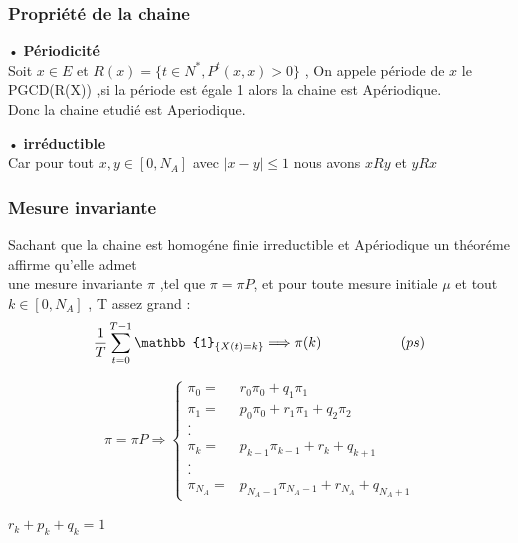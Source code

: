 \documentclass[11pt,]{article}
\begin{document}
\subsubsection{Propriété de la chaine}\label{propriete-de-la-chaine}

• \textbf{Périodicité}\\
Soit \(x \in E\) et \(R(x)=\{t \in N^*, P^t(x,x)>0 \}\) , On appele
période de \(x\) le PGCD(R(X)) ,si la période est égale 1 alors la
chaine est Apériodique.\\
Donc la chaine etudié est Aperiodique.

• \textbf{irréductible}\\
Car pour tout \(x, y\in[0,N_A]\) avec \(|x-y|\leq 1\) nous avons
\(x R y\) et \(yRx\)

\subsubsection{Mesure invariante}\label{mesure-invariante}

Sachant que la chaine est homogéne finie irreductible et Apériodique un
théoréme affirme qu'elle admet\\
une mesure invariante \(\pi\) ,tel que \(\pi=\pi P\), et pour toute
mesure initiale \(\mu\) et tout \(k \in [0,N_A]\) , T assez grand :\\
\[\frac{1}{T}\sum_{t=0}^{T-1}\mathbb{1}_{\{X(t)=k\}} \Longrightarrow \pi(k) \hspace{20mm} (ps) \]

\[ \pi=\pi P \Rightarrow \left\{
  \begin{array}{rcr}
    \pi_0=&r_0\pi_0+q_1\pi_1 \\
   \pi_1=&p_0\pi_0+r_1\pi_1+q_2\pi_2 \\
   .\\
   .\\
   \pi_k=&p_{k-1}\pi_{k-1}+r_k+q_{k+1}\\
   .\\
   .\\
   \pi_{N_A}=&p_{N_A-1}\pi_{N_A-1}+r_{N_A}+q_{N_A+1}
  \end{array}
\right.
  \]

\begin{flushright}
  $r_k+p_k+q_k=1$
  \end{flushright}
\end{document}
